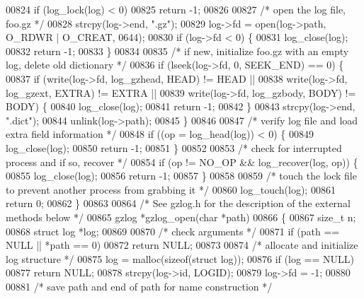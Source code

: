 \begin{DoxyCode}
{00824     \textcolor{keywordflow}{if} (log\_lock(log) < 0)
00825         \textcolor{keywordflow}{return} -1;
00826 
00827     \textcolor{comment}{/* open the log file, foo.gz */}
00828     strcpy(log->end, \textcolor{stringliteral}{".gz"});
00829     log->fd = open(log->path, O\_RDWR | O\_CREAT, 0644);
00830     \textcolor{keywordflow}{if} (log->fd < 0) \{
00831         log\_close(log);
00832         \textcolor{keywordflow}{return} -1;
00833     \}
00834 
00835     \textcolor{comment}{/* if new, initialize foo.gz with an empty log, delete old dictionary */}
00836     \textcolor{keywordflow}{if} (lseek(log->fd, 0, SEEK\_END) == 0) \{
00837         \textcolor{keywordflow}{if} (write(log->fd, log\_gzhead, HEAD) != HEAD ||
00838             write(log->fd, log\_gzext, EXTRA) != EXTRA ||
00839             write(log->fd, log\_gzbody, BODY) != BODY) \{
00840             log\_close(log);
00841             \textcolor{keywordflow}{return} -1;
00842         \}
00843         strcpy(log->end, \textcolor{stringliteral}{".dict"});
00844         unlink(log->path);
00845     \}
00846 
00847     \textcolor{comment}{/* verify log file and load extra field information */}
00848     \textcolor{keywordflow}{if} ((op = log\_head(log)) < 0) \{
00849         log\_close(log);
00850         \textcolor{keywordflow}{return} -1;
00851     \}
00852 
00853     \textcolor{comment}{/* check for interrupted process and if so, recover */}
00854     \textcolor{keywordflow}{if} (op != NO\_OP && log\_recover(log, op)) \{
00855         log\_close(log);
00856         \textcolor{keywordflow}{return} -1;
00857     \}
00858 
00859     \textcolor{comment}{/* touch the lock file to prevent another process from grabbing it */}
00860     log\_touch(log);
00861     \textcolor{keywordflow}{return} 0;
00862 \}
00863 
00864 \textcolor{comment}{/* See gzlog.h for the description of the external methods below */}
00865 gzlog *gzlog\_open(\textcolor{keywordtype}{char} *path)
00866 \{
00867     \textcolor{keywordtype}{size\_t} n;
00868     \textcolor{keyword}{struct }log *log;
00869 
00870     \textcolor{comment}{/* check arguments */}
00871     \textcolor{keywordflow}{if} (path == NULL || *path == 0)
00872         \textcolor{keywordflow}{return} NULL;
00873 
00874     \textcolor{comment}{/* allocate and initialize log structure */}
00875     log = malloc(\textcolor{keyword}{sizeof}(\textcolor{keyword}{struct} log));
00876     \textcolor{keywordflow}{if} (log == NULL)
00877         \textcolor{keywordflow}{return} NULL;
00878     strcpy(log->id, LOGID);
00879     log->fd = -1;
00880 
00881     \textcolor{comment}{/* save path and end of path for name construction */}
}
\end{DoxyCode}
